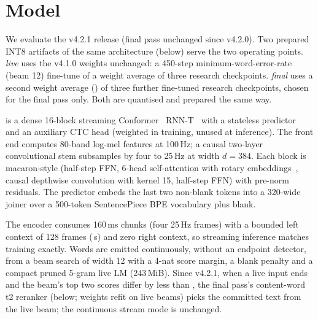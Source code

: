 \section{Model}\label{sec:model}

 We evaluate the v4.2.1 release (final pass unchanged since v4.2.0). Two prepared INT8 artifacts of the same architecture
(below) serve the two operating points. \emph{\ultra{} live} uses the v4.1.0 weights unchanged: a 450-step
minimum-word-error-rate (beam 12) fine-tune of a weight average of three research checkpoints.
\emph{\ultra{} final} uses a second weight average (\FinSoupWeights) of three further fine-tuned research
checkpoints, chosen for the final pass only. Both are quantised and prepared the same way.

 \ultra{} is a dense 16-block streaming
Conformer~\cite{gulati2020conformer} RNN-T~\cite{graves2012rnnt} with a stateless
predictor~\cite{ghodsi2020stateless} and an auxiliary CTC head (weighted \CtcWeight{} in training,
unused at inference). The front end computes 80-band log-mel features at 100\,Hz; a causal
two-layer convolutional stem subsamples by four to 25\,Hz at width $d=384$. Each block is
macaron-style (half-step FFN, 6-head self-attention with rotary
embeddings~\cite{su2021roformer}, causal depthwise convolution with kernel 15, half-step FFN) with
pre-norm residuals. The predictor embeds the last two non-blank tokens into a 320-wide joiner over a
500-token SentencePiece BPE vocabulary plus blank.

 The encoder consumes 160\,ms chunks (four 25\,Hz frames) with a
bounded left context of 128 frames (\LeftCtxSec\,s) and zero right context, so streaming inference
matches training exactly. Words are emitted continuously, without an endpoint detector, from a beam search of width 12 with a
4-nat score margin, a blank penalty and a compact pruned 5-gram live LM (243\,MiB). Since v4.2.1, when a live input
ends and the beam's top two scores differ by less than \LivSkipMargin, the final pass's content-word t2 reranker (below; weights
refit on live beams) picks the committed text from the live beam; the continuous stream mode is unchanged.

